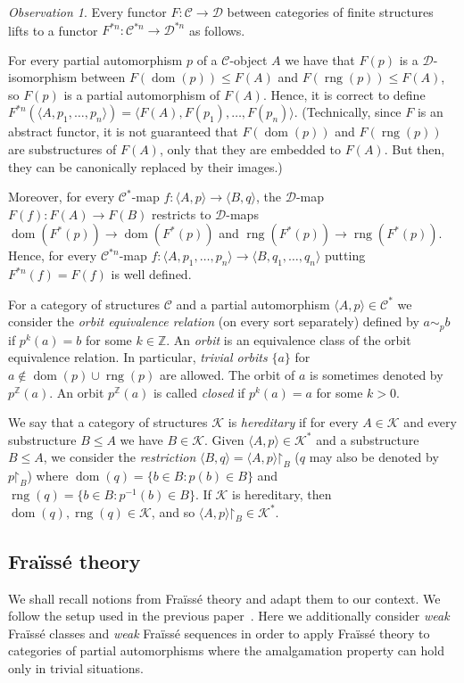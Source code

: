 \documentclass[oneside,notitlepage,12pt]{article}
\theoremstyle{definition}
\theoremstyle{remark}
\newtheorem{observation}[tw]{Observation}
\newcommand \set [1]{\{#1\}}
\newcommand \seq [1]{\langle #1 \rangle}
\newcommand \maps {\colon} %
\newcommand \restr [1] {\mathord{\upharpoonright}_{#1}}
\newcommand \dom {\operatorname{dom}}
\newcommand \rng {\operatorname{rng}}
\newcommand \Z {\mathbb{Z}}
\newcommand \C {\mathscr{C}}
\newcommand \D {\mathscr{D}}
\newcommand \K {\mathscr{K}}
\begin{document}
\begin{observation}
Every functor $F\maps \C \to \D$ between categories of finite structures lifts to a functor $F^{*n}\maps \C^{*n} \to \D^{*n}$ as follows.

For every partial automorphism $p$ of a $\C$-object $A$ we have that $F(p)$ is a $\D$-isomorphism between $F(\dom(p)) \leq F(A)$ and $F(\rng(p)) \leq F(A)$, so $F(p)$ is a partial automorphism of $F(A)$.
Hence, it is correct to define $F^{*n}(\seq{A, p_1, \ldots, p_n}) = \seq{F(A), F(p_1), \ldots, F(p_n)}$.
(Technically, since $F$ is an abstract functor, it is not guaranteed that $F(\dom(p))$ and $F(\rng(p))$ are substructures of $F(A)$, only that they are embedded to $F(A)$.
But then, they can be canonically replaced by their images.)

Moreover, for every $\C^*$-map $f\maps \seq{A, p} \to \seq{B, q}$,  the $\D$-map $F(f)\maps F(A) \to F(B)$ restricts to  $\D$-maps $\dom(F^*(p)) \to \dom(F^*(p))$ and $\rng(F^*(p)) \to \rng(F^*(p))$.
Hence, for every $\C^{*n}$-map $f\maps \seq{A, p_1, \ldots, p_n} \to \seq{B, q_1, \ldots, q_n}$ putting $F^{*n}(f) = F(f)$ is well defined.
\end{observation}

For a category of structures $\C$ and a partial automorphism $\seq{A, p} \in \C^*$ we consider the \emph{orbit equivalence relation} (on every sort separately) defined by $a \sim_p b$ if $p^k(a) = b$ for some $k \in \Z$.
An \emph{orbit} is an equivalence class of the orbit equivalence relation.
In particular, \emph{trivial orbits} $\set{a}$ for $a \notin \dom(p) \cup \rng(p)$ are allowed.
The orbit of $a$ is sometimes denoted by $p^\Z(a)$.
An orbit $p^\Z(a)$ is called \emph{closed} if $p^k(a) = a$ for some $k > 0$.

We say that a category of structures $\K$ is \emph{hereditary} if for every $A \in \K$ and every substructure $B \leq A$ we have $B \in \K$.
Given $\seq{A, p} \in \K^*$ and a substructure $B \leq A$, we consider the \emph{restriction} $\seq{B, q} = \seq{A, p}\restr{B}$ ($q$ may also be denoted by $p\restr{B}$) where $\dom(q) = \set{b \in B: p(b) \in B}$ and $\rng(q) = \set{b \in B: p^{-1}(b) \in B}$.
If $\K$ is hereditary, then $\dom(q), \rng(q) \in \K$, and so $\seq{A, p}\restr{B} \in \K^*$.


\subsection{Fraïssé theory}

We shall recall notions from Fraïssé theory and adapt them to our context.
We follow the setup used in the previous paper~\cite{paper1}.
Here we additionally consider \emph{weak} Fraïssé classes and \emph{weak} Fraïssé sequences in order to apply Fraïssé theory to categories of partial automorphisms where the amalgamation property can hold only in trivial situations.
\end{document}
